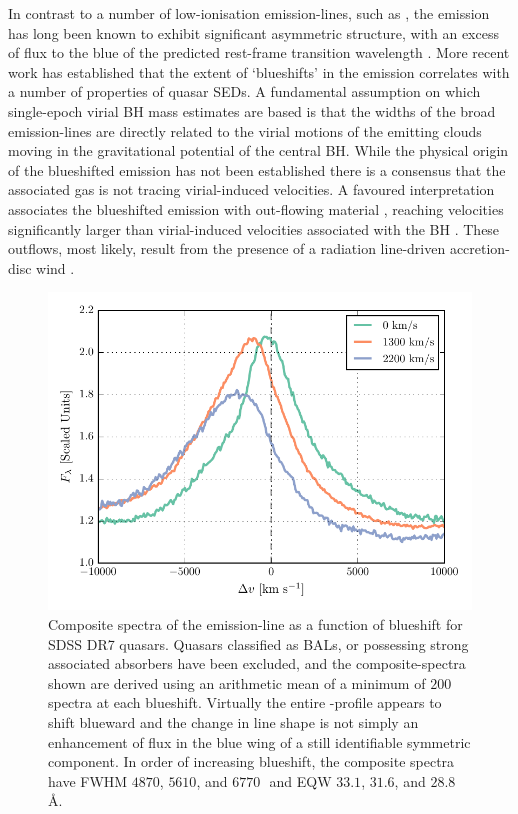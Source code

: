 In contrast to a number of low-ionisation emission-lines, such as , the  emission has long been known to exhibit significant asymmetric structure, with an excess of flux to the blue of the predicted rest-frame transition wavelength \citep{gaskell82}. 
More recent work \citep[e.g.][]{sulentic00a, richards11} has established that the extent of `blueshifts' in the  emission correlates with a number of properties of quasar SEDs. 
A fundamental assumption on which single-epoch virial BH mass estimates are based is that the widths of the broad emission-lines are directly related to the virial motions of the emitting clouds moving in the gravitational potential of the central BH. 
While the physical origin of the blueshifted emission has not been established there is a consensus that the associated gas is not tracing virial-induced velocities.  
A favoured interpretation associates the blueshifted emission with out-flowing material \citep[see][for a recent review]{netzer15}, reaching velocities significantly larger than virial-induced velocities associated with the BH \citep[e.g.][]{sulentic07, richards11}.
These outflows, most likely, result from the presence of a radiation line-driven accretion-disc wind \citep[e.g.][]{konigl94, murray95, proga00, everett05, gallagher15,higginbottom15}.  

\begin{figure}[h!]
    \centering
    \includegraphics[width=0.9\linewidth]{figures/chapter03/civ_composites.pdf}
    \caption[{Composite spectra of the  emission-line as a function of  blueshift for SDSS DR7 quasars.}]{Composite spectra of the  emission-line as a function of  blueshift for SDSS DR7 quasars. Quasars classified as BALs, or possessing strong associated absorbers have been excluded, and the composite-spectra shown are derived using an arithmetic mean of a minimum of $200$ spectra at each blueshift. Virtually the entire -profile appears to shift blueward and the change in line shape is not simply an enhancement of flux in the blue wing of a still identifiable symmetric component. In order of increasing  blueshift, the composite spectra have FWHM $4870$, $5610$, and $6770$\,\kms\, and EQW $33.1$, $31.6$, and $28.8$\,\AA.}
    \label{fig:civ_composites}
\end{figure}

